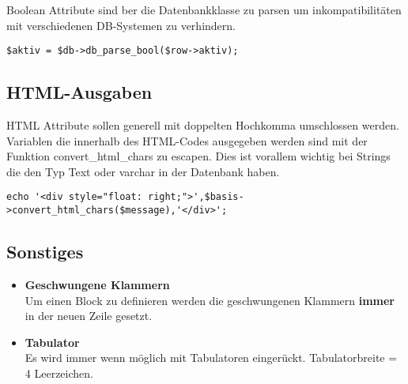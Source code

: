 Boolean Attribute sind ber die Datenbankklasse zu parsen um inkompatibilit\"aten mit verschiedenen DB-Systemen zu verhindern.

\begin{verbatim}
$aktiv = $db->db_parse_bool($row->aktiv);
\end{verbatim}

\subsection{HTML-Ausgaben}
HTML Attribute sollen generell mit doppelten Hochkomma umschlossen werden.
Variablen die innerhalb des HTML-Codes ausgegeben werden sind mit der Funktion convert\_html\_chars zu escapen. Dies ist vorallem wichtig bei Strings die den Typ Text oder varchar in der Datenbank haben. 

\begin{verbatim}
echo '<div style="float: right;">',$basis->convert_html_chars($message),'</div>';
\end{verbatim}


\subsection{Sonstiges}
\begin{itemize}
	\item {\bf Geschwungene Klammern} \\
	Um einen Block zu definieren werden die geschwungenen Klammern {\bf immer} in der neuen Zeile gesetzt. 
	\item {\bf Tabulator} \\
	Es wird immer wenn m\"oglich mit Tabulatoren einger\"uckt. Tabulatorbreite = 4 Leerzeichen. 
\end{itemize}